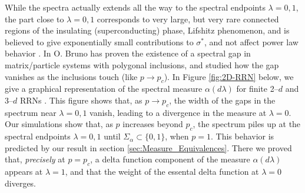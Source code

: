 \documentclass[english,12pt,jmp,graphicx]{revtex4-1}
\begin{document}
While the spectra actually extends all the way
to the spectral endpoints $\lambda=0,1$, the part close to $\lambda=0,1$
corresponds to very large, but very rare connected regions of the
insulating (superconducting) phase, Lifshitz phenomenon, and is
believed to give exponentially small contributions to $\sigma^*$, and not
affect power law behavior \cite{Golden:PRL-3935}. In
\cite{Bruno:PRSLA-353} O. Bruno has proven the existence of a spectral
gap in matrix/particle systems with polygonal inclusions, and studied
how the gap vanishes as the inclusions touch (like $p\to p_c$). In
Figure \ref{fig:2D-RRN} below, we give a graphical representation of the
spectral measure $\alpha(d\lambda)$ for finite 2--$d$ and 3--$d$ RRNs
\cite{Golden:JoB:337}. This figure shows that, as $p\to p_c$, the width
of the gaps in the spectrum near $\lambda=0,1$ vanish, leading to a
divergence in the measure at $\lambda=0$. Our simulations show that, as $p$
increases beyond $p_c$, the spectrum piles up at the spectral
endpoints $\lambda=0,1$ until $\Sigma_\alpha\subset\{0,1\}$, when $p=1$. This behavior is
predicted by our result in section
\ref{sec:Measure_Equivalences}. There we proved that, \emph{precisely}
at $p=p_c$, a delta function component of the measure $\alpha(d\lambda)$ appears 
at $\lambda=1$, and that the weight of the essental delta function at $\lambda=0$
diverges.
\end{document}
